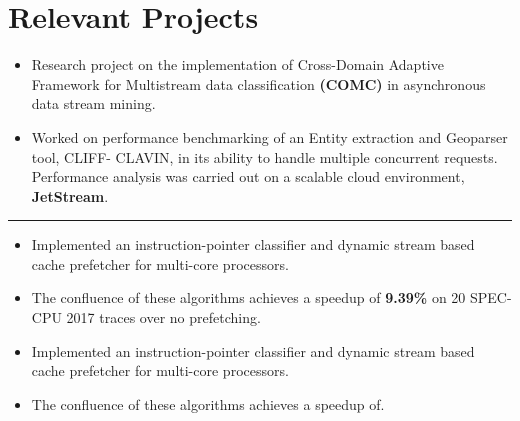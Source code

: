 \documentclass[10pt, margin=0.5in]{deedy-resume-openfont}
\begin{document}
\begin{minipage}[t]{0.48\textwidth}

\vspace{-8pt}
\section{Relevant Projects}


\begin{itemize}[leftmargin=*, noitemsep]
  \item Research project on the implementation of Cross-Domain Adaptive Framework for Multistream data classification \textbf{(COMC)} in asynchronous data stream mining.
  \item Worked on performance benchmarking of an Entity extraction and Geoparser tool, CLIFF-
  CLAVIN, in its ability to handle multiple concurrent requests. Performance analysis was carried 
  out on a scalable cloud environment, \textbf{JetStream}.
\end{itemize}


\vspace{-6pt}				%
\rule{\textwidth}{0.5pt}	%
\vspace{-10pt}				%


\begin{itemize}[leftmargin=*, noitemsep]
    \item Implemented an instruction-pointer classifier and dynamic stream based cache prefetcher 
for multi-core processors.
	\item The confluence of these algorithms achieves a speedup of \textbf{9.39\%} on 20 SPEC-CPU 2017 traces over no prefetching.
\end{itemize}

\vspace{5pt}
\begin{itemize}[leftmargin=*, noitemsep]
    \item Implemented an instruction-pointer classifier and dynamic stream based cache prefetcher 
for multi-core processors.
	\item The confluence of these algorithms achieves a speedup of.
\end{itemize}


\end{minipage}
\end{document}
